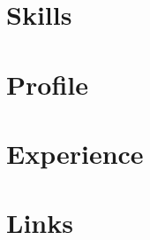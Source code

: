 \documentclass[10pt]{article} %
\begin{document}
\begin{paracol}{2}
\section{\Large Skills}

\switchcolumn %

\section{Profile}

\section{Experience}

\section{Links}


\end{paracol}

\end{document}
